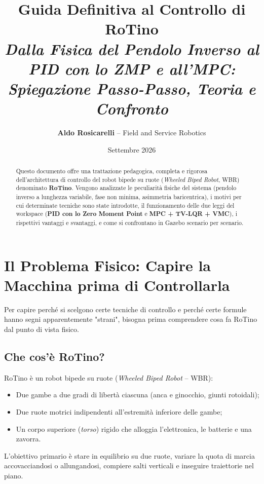 \documentclass[11pt,a4paper]{article}
\title{\LARGE\textbf{Guida Definitiva al Controllo di RoTino}\\
\large\textit{Dalla Fisica del Pendolo Inverso al PID con lo ZMP e all'MPC:\\
Spiegazione Passo-Passo, Teoria e Confronto}}
\author{\textbf{Aldo Rosicarelli} -- Field and Service Robotics}
\date{Settembre 2026}
\begin{document}
\maketitle

\begin{abstract}
Questo documento offre una trattazione pedagogica, completa e rigorosa dell'architettura di controllo del robot bipede su ruote (\textit{Wheeled Biped Robot}, WBR) denominato \textbf{RoTino}. Vengono analizzate le peculiarità fisiche del sistema (pendolo inverso a lunghezza variabile, fase non minima, asimmetria baricentrica), i motivi per cui determinate tecniche sono state introdotte, il funzionamento delle due leggi del workspace (\textbf{PID con lo Zero Moment Point} e \textbf{MPC + TV-LQR + VMC}), i rispettivi vantaggi e svantaggi, e come si confrontano in Gazebo scenario per scenario.
\end{abstract}

\tableofcontents
\newpage

\section{Il Problema Fisico: Capire la Macchina prima di Controllarla}

Per capire perché si scelgono certe tecniche di controllo e perché certe formule hanno segni apparentemente "strani", bisogna prima comprendere cosa fa RoTino dal punto di vista fisico.

\subsection{Che cos'è RoTino?}
RoTino è un robot bipede su ruote (\textit{Wheeled Biped Robot} -- WBR):
\begin{itemize}
    \item Due gambe a due gradi di libertà ciascuna (anca e ginocchio, giunti rotoidali);
    \item Due ruote motrici indipendenti all'estremità inferiore delle gambe;
    \item Un corpo superiore (\textit{torso}) rigido che alloggia l'elettronica, le batterie e una zavorra.
\end{itemize}
L'obiettivo primario è stare in equilibrio su due ruote, variare la quota di marcia accovacciandosi o allungandosi, compiere salti verticali e inseguire traiettorie nel piano.
\end{document}
